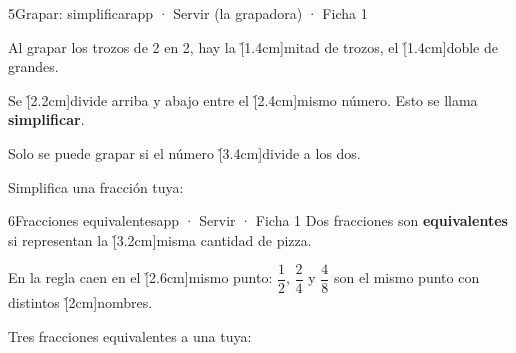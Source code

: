 \documentclass[12pt]{article}
\providecommand{\dv}{\mathbin{:}}
\begin{document}
\begin{cromo}{5}{Grapar: simplificar}{app · Servir (la grapadora) · Ficha 1}
\begin{minipage}[c]{.6\linewidth}\raggedright
\completa Al grapar los trozos de 2 en 2, hay la \h[1.4cm]{mitad} de trozos, el \h[1.4cm]{doble} de grandes.\par\vspace{2mm}
Se \h[2.2cm]{divide} arriba y abajo entre el \h[2.4cm]{mismo número}. Esto se llama \textbf{simplificar}.\par\vspace{2mm}
Solo se puede grapar si el número \h[3.4cm]{divide a los dos}.
\end{minipage}%
\begin{minipage}[c]{.4\linewidth}\centering{}\end{minipage}

\vspace{2mm}
\tuejemplo Simplifica una fracción tuya:
\espacio[1.2cm]{$\dfrac{10}{15} = \dfrac{10\dv 5}{15\dv 5} = \dfrac{2}{3}$}
\end{cromo}

\begin{cromo}{6}{Fracciones equivalentes}{app · Servir · Ficha 1}
\completa Dos fracciones son \textbf{equivalentes} si representan la \h[3.2cm]{misma cantidad} de pizza.\par\vspace{2mm}
En la regla caen en el \h[2.6cm]{mismo punto}: $\dfrac{1}{2}$, $\dfrac{2}{4}$ y $\dfrac{4}{8}$ son el mismo punto con distintos \h[2cm]{nombres}.

\vspace{2mm}
{\centering{}\par\vspace{1mm}\par\vspace{1mm}\par}

\vspace{1mm}
\tuejemplo Tres fracciones equivalentes a una tuya:
\end{cromo}
\end{document}
